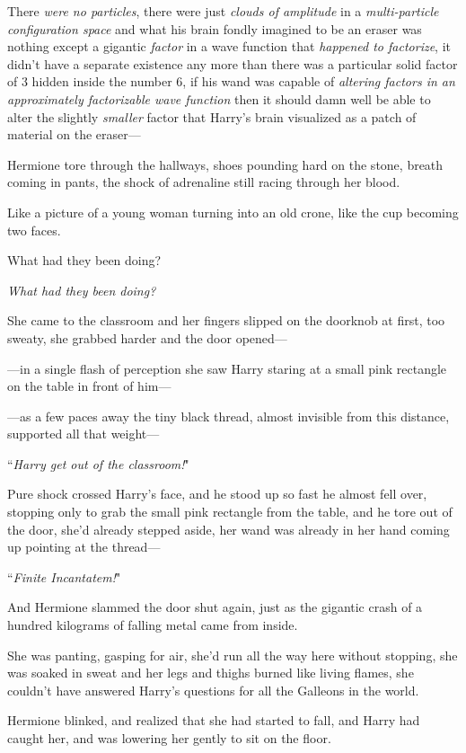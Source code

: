 There \emph{were no particles}, there were just \emph{clouds of amplitude} in a \emph{multi-particle configuration space} and what his brain fondly imagined to be an eraser was nothing except a gigantic \emph{factor} in a wave function that \emph{happened to factorize}, it didn't have a separate existence any more than there was a particular solid factor of 3 hidden inside the number 6, if his wand was capable of \emph{altering factors in an approximately factorizable wave function} then it should damn well be able to alter the slightly \emph{smaller} factor that Harry's brain visualized as a patch of material on the eraser—

\later

Hermione tore through the hallways, shoes pounding hard on the stone, breath coming in pants, the shock of adrenaline still racing through her blood.

Like a picture of a young woman turning into an old crone, like the cup becoming two faces.

What had they been doing?

\emph{What had they been doing?}

She came to the classroom and her fingers slipped on the doorknob at first, too sweaty, she grabbed harder and the door opened—

—in a single flash of perception she saw Harry staring at a small pink rectangle on the table in front of him—

—as a few paces away the tiny black thread, almost invisible from this distance, supported all that weight—

``\emph{Harry get out of the classroom!}"

Pure shock crossed Harry's face, and he stood up so fast he almost fell over, stopping only to grab the small pink rectangle from the table, and he tore out of the door, she'd already stepped aside, her wand was already in her hand coming up pointing at the thread—

``\emph{Finite Incantatem!}"

And Hermione slammed the door shut again, just as the gigantic crash of a hundred kilograms of falling metal came from inside.

She was panting, gasping for air, she'd run all the way here without stopping, she was soaked in sweat and her legs and thighs burned like living flames, she couldn't have answered Harry's questions for all the Galleons in the world.

Hermione blinked, and realized that she had started to fall, and Harry had caught her, and was lowering her gently to sit on the floor.

